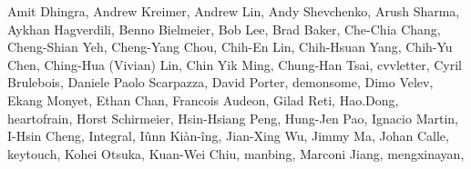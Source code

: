 Amit Dhingra,                  %
Andrew Kreimer,                %
Andrew Lin,                    %
Andy Shevchenko,               %
Arush Sharma,                  %
Aykhan Hagverdili,             %
Benno Bielmeier,               %
Bob Lee,                       %
Brad Baker,                    %
Che-Chia Chang,                %
Cheng-Shian Yeh,               %
Cheng-Yang Chou,               %
Chih-En Lin,                   %
Chih-Hsuan Yang,               %
Chih-Yu Chen,                  %
Ching-Hua (Vivian) Lin,        %
Chin Yik Ming,                 %
Chung-Han Tsai,                %
cvvletter,                     %
Cyril Brulebois,               %
Daniele Paolo Scarpazza,       %
David Porter,                  %
demonsome,                     %
Dimo Velev,                    %
Ekang Monyet,                  %
Ethan Chan,                    %
Francois Audeon,               %
Gilad Reti,                    %
Hao.Dong,                      %
heartofrain,                   %
Horst Schirmeier,              %
Hsin-Hsiang Peng,              %
Hung-Jen Pao,                  %
Ignacio Martin,                %
I-Hsin Cheng,                  %
Integral,                      %
Iûnn Kiàn-îng,                 %
Jian-Xing Wu,                  %
Jimmy Ma,                      %
Johan Calle,                   %
keytouch,                      %
Kohei Otsuka,                  %
Kuan-Wei Chiu,                 %
manbing,                       %
Marconi Jiang,                 %
mengxinayan,                   %
